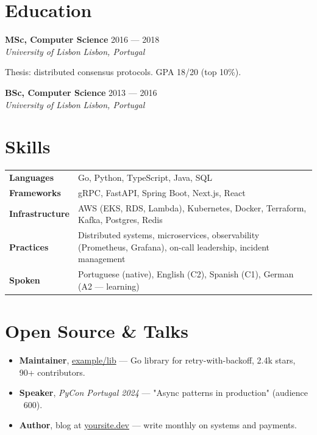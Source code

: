 \documentclass[a4paper,11pt]{article}
\newcommand{\education}[4]{%
  \noindent\textbf{#1} \hfill #3 \\
  \textit{#2} \hfill \textit{#4}
  \vspace{2pt}
}
\begin{document}

\section*{Education}

\education{MSc, Computer Science}{University of Lisbon}{2016 — 2018}{Lisbon, Portugal}
Thesis: distributed consensus protocols. GPA 18/20 (top 10\%).

\vspace{4pt}

\education{BSc, Computer Science}{University of Lisbon}{2013 — 2016}{Lisbon, Portugal}

%

\section*{Skills}

\noindent
\begin{tabularx}{\linewidth}{@{}lX@{}}
\textbf{Languages} & Go, Python, TypeScript, Java, SQL \\
\textbf{Frameworks} & gRPC, FastAPI, Spring Boot, Next.js, React \\
\textbf{Infrastructure} & AWS (EKS, RDS, Lambda), Kubernetes, Docker, Terraform, Kafka, Postgres, Redis \\
\textbf{Practices} & Distributed systems, microservices, observability (Prometheus, Grafana), on-call leadership, incident management \\
\textbf{Spoken} & Portuguese (native), English (C2), Spanish (C1), German (A2 — learning) \\
\end{tabularx}


\section*{Open Source \& Talks}

\begin{itemize}
  \item \textbf{Maintainer}, \href{https://github.com/example/lib}{example/lib} — Go library for retry-with-backoff, 2.4k stars, 90+ contributors.
  \item \textbf{Speaker}, \emph{PyCon Portugal 2024} — "Async patterns in production" (audience ~600).
  \item \textbf{Author}, blog at \href{https://yoursite.dev}{yoursite.dev} — write monthly on systems and payments.
\end{itemize}
\end{document}
